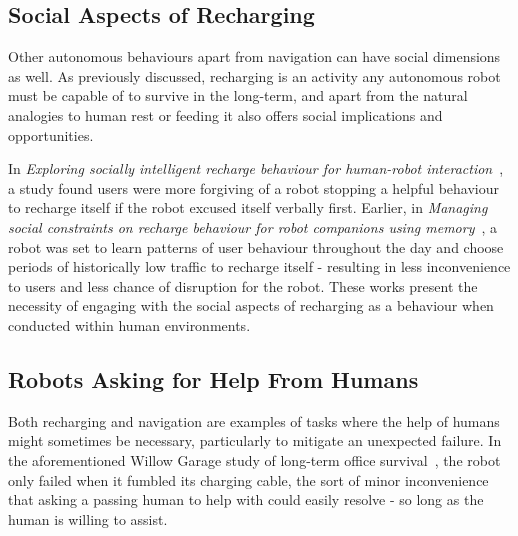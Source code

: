 \documentclass{sfuthesis}
\begin{document}

\subsection{Social Aspects of Recharging}

Other autonomous behaviours apart from navigation can have social dimensions as well. As previously discussed, recharging is an activity any autonomous robot must be capable of to survive in the long-term, and apart from the natural analogies to human rest or feeding it also offers social implications and opportunities.

In \textit{Exploring socially intelligent recharge behaviour for human-robot interaction}~\cite{deshmukh2014exploring}, a study found users were more forgiving of a robot stopping a helpful behaviour to recharge itself if the robot excused itself verbally first. Earlier, in \textit{Managing social constraints on recharge behaviour for robot companions using memory}~\cite{deshmukh2011managing}, a robot was set to learn patterns of user behaviour throughout the day and choose periods of historically low traffic to recharge itself - resulting in less inconvenience to users and less chance of disruption for the robot. These works present the necessity of engaging with the social aspects of recharging as a behaviour when conducted within human environments.



\subsection{Robots Asking for Help From Humans}

Both recharging and navigation are examples of tasks where the help of humans might sometimes be necessary, particularly to mitigate an unexpected failure. In the aforementioned Willow Garage study of long-term office survival~\cite{meeussen2011long}, the robot only failed when it fumbled its charging cable, the sort of minor inconvenience that asking a passing human to help with could easily resolve - so long as the human is willing to assist.
\end{document}
